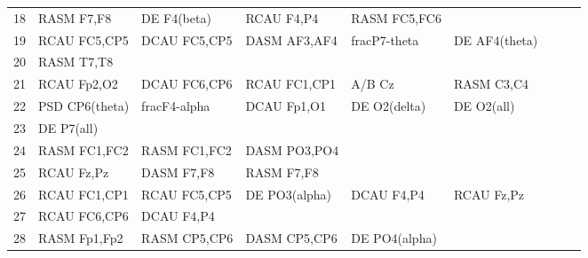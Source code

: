 \begin{landscape}
\begin{table}[]
\begin{tabular}{l|llllllll}
18                 & RASM F7,F8           & DE F4(beta)             & RCAU F4,P4           & RASM FC5,FC6       &                       &                      &                 &                 \\
19                 & RCAU FC5,CP5         & DCAU FC5,CP5            & DASM AF3,AF4         & fracP7-theta       & DE AF4(theta)         &                      &                 &                 \\
20                 & RASM T7,T8           &                         &                      &                    &                       &                      &                 &                 \\
21                 & RCAU Fp2,O2          & DCAU FC6,CP6            & RCAU FC1,CP1         & A/B Cz             & RASM C3,C4            &                      &                 &                 \\
22                 & PSD CP6(theta)       & fracF4-alpha            & DCAU Fp1,O1          & DE O2(delta)       & DE O2(all)            &                      &                 &                 \\
23                 & DE P7(all)           &                         &                      &                    &                       &                      &                 &                 \\
24                 & RASM FC1,FC2         & RASM FC1,FC2            & DASM PO3,PO4         &                    &                       &                      &                 &                 \\
25                 & RCAU Fz,Pz           & DASM F7,F8              & RASM F7,F8           &                    &                       &                      &                 &                 \\
26                 & RCAU FC1,CP1         & RCAU FC5,CP5            & DE PO3(alpha)        & DCAU F4,P4         & RCAU Fz,Pz            &                      &                 &                 \\
27                 & RCAU FC6,CP6         & DCAU F4,P4              &                      &                    &                       &                      &                 &                 \\
28                 & RASM Fp1,Fp2         & RASM CP5,CP6            & DASM CP5,CP6         & DE PO4(alpha)      &                       &                      &                 &                 \\

\end{tabular}
\end{table}
\end{landscape}
